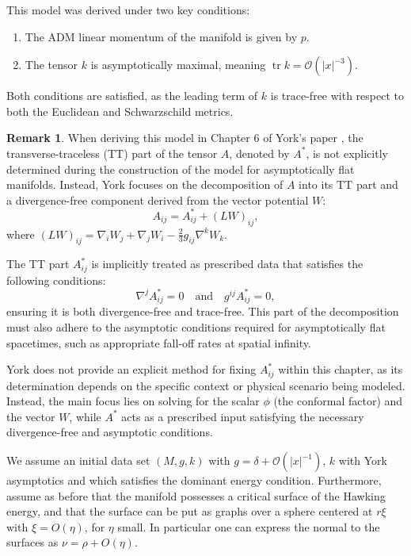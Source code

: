 \documentclass[12pt,a4paper]{amsart}
\theoremstyle{plain}
\theoremstyle{definition}
\newtheorem{remark}[theorem]{Remark}
\begin{document}
This model was derived under two key conditions:
\begin{enumerate}
    \item The ADM linear momentum of the manifold is given by \( p \).
    \item The tensor \( k \) is asymptotically maximal, meaning \( \operatorname{tr} k = \mathcal{O}(|x|^{-3}) \).
\end{enumerate}
Both conditions are satisfied, as the leading term of \( k \) is trace-free with respect to both the Euclidean and Schwarzschild metrics. 
\begin{remark}
    When deriving this model in Chapter 6 of York's paper \cite{york1979kinematics}, the transverse-traceless (TT) part of the tensor \( A \), denoted by \( A^* \), is not explicitly determined during the construction of the model for asymptotically flat manifolds. Instead, York focuses on the decomposition of \( A \) into its TT part and a divergence-free component derived from the vector potential \( W \):
\[
A_{ij} = A^*_{ij} + (LW)_{ij},
\]
where \( (LW)_{ij} = \nabla_i W_j + \nabla_j W_i - \frac{2}{3} g_{ij} \nabla^k W_k \).

The TT part \( A^*_{ij} \) is implicitly treated as prescribed data that satisfies the following conditions:
\[
\nabla^j A^*_{ij} = 0 \quad \text{and} \quad g^{ij} A^*_{ij} = 0,
\]
ensuring it is both divergence-free and trace-free. This part of the decomposition must also adhere to the asymptotic conditions required for asymptotically flat spacetimes, such as appropriate fall-off rates at spatial infinity.


York does not provide an explicit method for fixing \( A^*_{ij} \) within this chapter, as its determination depends on the specific context or physical scenario being modeled. Instead, the main focus lies on solving for the scalar \( \phi \) (the conformal factor) and the vector \( W \), while \( A^* \) acts as a prescribed input satisfying the necessary divergence-free and asymptotic conditions.
\end{remark}
We assume  an initial data set $(M,g,k)$ with $g=\delta + \mathcal{O}(|x|^{-1}) $, $k$ with York asymptotics  and  which satisfies the dominant energy condition. Furthermore, assume as before that the manifold possesses a critical surface of the Hawking energy, and that the surface can be put as graphs over a sphere centered at $r \xi$ with $\xi=O(\eta)$, for $\eta$ small. In particular one can express the normal to the surfaces as $\nu= \rho +O(\eta)$.
\end{document}
